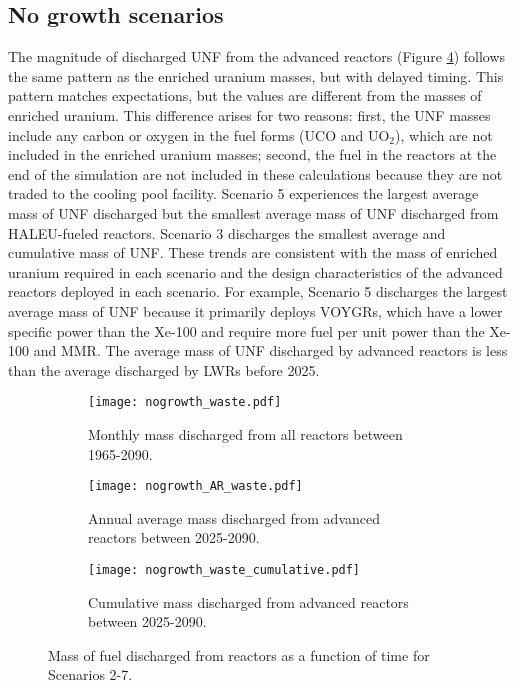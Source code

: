 \subsection{No growth scenarios}
The magnitude of discharged \gls{UNF} from the advanced reactors 
(Figure \ref{fig:nogrowth_waste}) follows the same pattern as the enriched 
uranium masses, but with delayed timing. This pattern matches expectations, 
but the values are different from the masses of enriched uranium. 
This difference arises for two reasons: first, the 
\gls{UNF} masses include any carbon or oxygen in the fuel forms (UCO and 
UO$_2$), which 
are not included in the enriched uranium masses; second, the 
fuel in the reactors at the end of the simulation are not included in these 
calculations because they are not traded to the cooling pool facility.
Scenario 5 experiences the largest average mass of \gls{UNF} 
discharged but the smallest average mass of \gls{UNF} discharged from 
\gls{HALEU}-fueled reactors. 
Scenario 3 discharges the smallest average and cumulative mass of \gls{UNF}.
These trends are consistent with the mass of enriched uranium required 
in each scenario and the design characteristics of the advanced 
reactors deployed in each scenario. For example, Scenario 5 discharges the 
largest average mass of \gls{UNF} because it primarily deploys VOYGRs, which 
have a lower specific power than the Xe-100 and require more fuel per unit 
power than the Xe-100 and \gls{MMR}. 
The average mass of \gls{UNF} discharged by advanced reactors is less than 
the average discharged by \glspl{LWR} before 2025. 

\begin{figure}[h!]
    \centering
    \begin{subfigure}[b]{0.45\textwidth}
        \centering
        \texttt{[image: nogrowth\_waste.pdf]}
        \caption{Monthly mass discharged from all reactors 
        between 1965-2090.}
        \label{fig:nogrowth_all_waste}
    \end{subfigure}
    \hfill
    \begin{subfigure}[b]{0.45\textwidth}
        \centering
        \texttt{[image: nogrowth\_AR\_waste.pdf]}
        \caption{Annual average mass discharged from 
        advanced reactors between 2025-2090.}
        \label{fig:nogrowth_AR_waste}
    \end{subfigure}
    \begin{subfigure}[b]{0.45\textwidth}
        \centering
        \texttt{[image: nogrowth\_waste\_cumulative.pdf]}
        \caption{Cumulative mass discharged from advanced reactors 
        between 2025-2090.}
        \label{fig:nogrowth_waste_cumulative}
    \end{subfigure}
       \caption{Mass of fuel discharged from reactors 
       as a function of time for Scenarios 2-7. }
       \label{fig:nogrowth_waste}
\end{figure}

